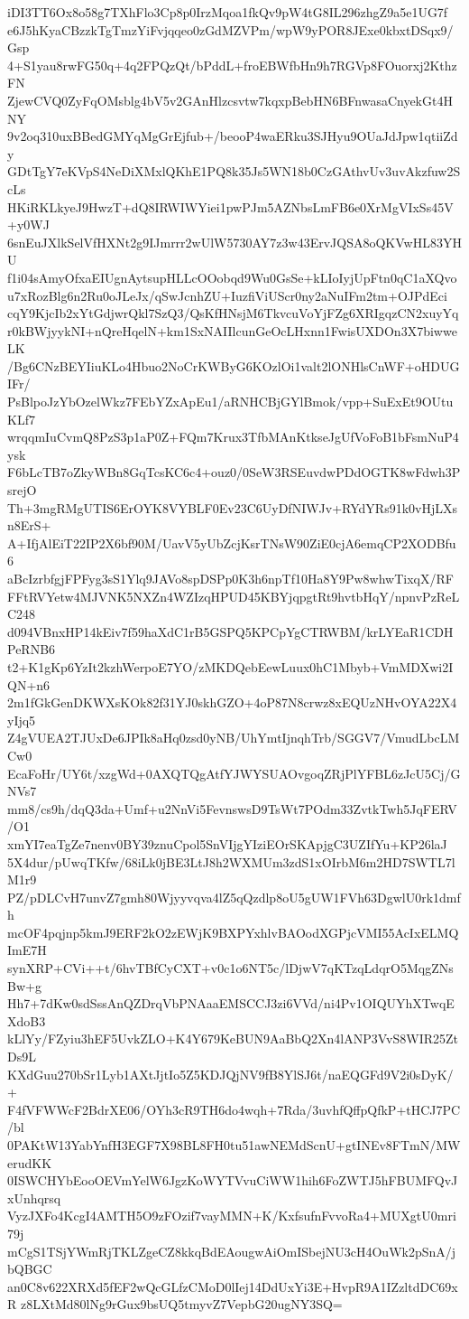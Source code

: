 iDI3TT6Ox8o58g7TXhFlo3Cp8p0IrzMqoa1fkQv9pW4tG8IL296zhgZ9a5e1UG7f
e6J5hKyaCBzzkTgTmzYiFvjqqeo0zGdMZVPm/wpW9yPOR8JExe0kbxtDSqx9/Gsp
4+S1yau8rwFG50q+4q2FPQzQt/bPddL+froEBWfbHn9h7RGVp8FOuorxj2KthzFN
ZjewCVQ0ZyFqOMsblg4bV5v2GAnHlzcsvtw7kqxpBebHN6BFnwasaCnyekGt4HNY
9v2oq310uxBBedGMYqMgGrEjfub+/beooP4waERku3SJHyu9OUaJdJpw1qtiiZdy
GDtTgY7eKVpS4NeDiXMxlQKhE1PQ8k35Js5WN18b0CzGAthvUv3uvAkzfuw2ScLs
HKiRKLkyeJ9HwzT+dQ8IRWIWYiei1pwPJm5AZNbsLmFB6e0XrMgVIxSs45V+y0WJ
6snEuJXlkSelVfHXNt2g9IJmrrr2wUlW5730AY7z3w43ErvJQSA8oQKVwHL83YHU
f1i04sAmyOfxaEIUgnAytsupHLLcOOobqd9Wu0GsSe+kLIoIyjUpFtn0qC1aXQvo
u7xRozBlg6n2Ru0oJLeJx/qSwJcnhZU+IuzfiViUScr0ny2aNuIFm2tm+OJPdEci
cqY9KjcIb2xYtGdjwrQkl7SzQ3/QsKfHNsjM6TkvcuVoYjFZg6XRIgqzCN2xuyYq
r0kBWjyykNI+nQreHqelN+km1SxNAIIlcunGeOcLHxnn1FwisUXDOn3X7biwweLK
/Bg6CNzBEYIiuKLo4Hbuo2NoCrKWByG6KOzlOi1valt2lONHlsCnWF+oHDUGIFr/
PsBlpoJzYbOzelWkz7FEbYZxApEu1/aRNHCBjGYlBmok/vpp+SuExEt9OUtuKLf7
wrqqmIuCvmQ8PzS3p1aP0Z+FQm7Krux3TfbMAnKtkseJgUfVoFoB1bFsmNuP4ysk
F6bLcTB7oZkyWBn8GqTcsKC6c4+ouz0/0SeW3RSEuvdwPDdOGTK8wFdwh3PsrejO
Th+3mgRMgUTIS6ErOYK8VYBLF0Ev23C6UyDfNIWJv+RYdYRs91k0vHjLXsn8ErS+
A+IfjAlEiT22IP2X6bf90M/UavV5yUbZcjKsrTNsW90ZiE0cjA6emqCP2XODBfu6
aBcIzrbfgjFPFyg3sS1Ylq9JAVo8spDSPp0K3h6npTf10Ha8Y9Pw8whwTixqX/RF
FFtRVYetw4MJVNK5NXZn4WZIzqHPUD45KBYjqpgtRt9hvtbHqY/npnvPzReLC248
d094VBnxHP14kEiv7f59haXdC1rB5GSPQ5KPCpYgCTRWBM/krLYEaR1CDHPeRNB6
t2+K1gKp6YzIt2kzhWerpoE7YO/zMKDQebEewLuux0hC1Mbyb+VmMDXwi2IQN+n6
2m1fGkGenDKWXsKOk82f31YJ0skhGZO+4oP87N8crwz8xEQUzNHvOYA22X4yIjq5
Z4gVUEA2TJUxDe6JPIk8aHq0zsd0yNB/UhYmtIjnqhTrb/SGGV7/VmudLbcLMCw0
EcaFoHr/UY6t/xzgWd+0AXQTQgAtfYJWYSUAOvgoqZRjPlYFBL6zJcU5Cj/GNVs7
mm8/cs9h/dqQ3da+Umf+u2NnVi5FevnswsD9TsWt7POdm33ZvtkTwh5JqFERV/O1
xmYI7eaTgZe7nenv0BY39znuCpol5SnVIjgYIziEOrSKApjgC3UZIfYu+KP26laJ
5X4dur/pUwqTKfw/68iLk0jBE3LtJ8h2WXMUm3zdS1xOIrbM6m2HD7SWTL7lM1r9
PZ/pDLCvH7unvZ7gmh80Wjyyvqva4lZ5qQzdlp8oU5gUW1FVh63DgwlU0rk1dmfh
mcOF4pqjnp5kmJ9ERF2kO2zEWjK9BXPYxhlvBAOodXGPjcVMI55AcIxELMQImE7H
synXRP+CVi++t/6hvTBfCyCXT+v0c1o6NT5c/lDjwV7qKTzqLdqrO5MqgZNsBw+g
Hh7+7dKw0sdSssAnQZDrqVbPNAaaEMSCCJ3zi6VVd/ni4Pv1OIQUYhXTwqEXdoB3
kLlYy/FZyiu3hEF5UvkZLO+K4Y679KeBUN9AaBbQ2Xn4lANP3VvS8WIR25ZtDs9L
KXdGuu270bSr1Lyb1AXtJjtIo5Z5KDJQjNV9fB8YlSJ6t/naEQGFd9V2i0sDyK/+
F4fVFWWcF2BdrXE06/OYh3cR9TH6do4wqh+7Rda/3uvhfQffpQfkP+tHCJ7PC/bl
0PAKtW13YabYnfH3EGF7X98BL8FH0tu51awNEMdScnU+gtINEv8FTmN/MWerudKK
0ISWCHYbEooOEVmYelW6JgzKoWYTVvuCiWW1hih6FoZWTJ5hFBUMFQvJxUnhqrsq
VyzJXFo4KcgI4AMTH5O9zFOzif7vayMMN+K/KxfsufnFvvoRa4+MUXgtU0mri79j
mCgS1TSjYWmRjTKLZgeCZ8kkqBdEAougwAiOmISbejNU3cH4OuWk2pSnA/jbQBGC
an0C8v622XRXd5fEF2wQcGLfzCMoD0lIej14DdUxYi3E+HvpR9A1IZzltdDC69xR
z8LXtMd80lNg9rGux9bsUQ5tmyvZ7VepbG20ugNY3SQ=
